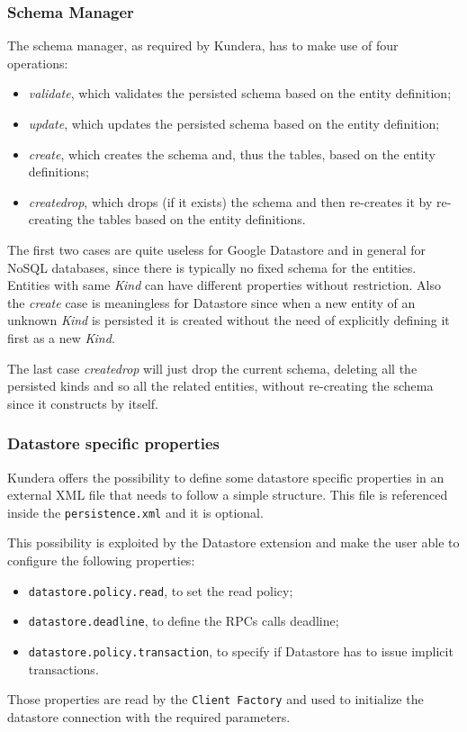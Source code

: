 \subsubsection{Schema Manager}
The schema manager, as required by Kundera, has to make use of four operations:
\begin{itemize}
\item \textit{validate}, which validates the persisted schema based on the entity definition;
\item \textit{update}, which updates the persisted schema based on the entity definition;
\item \textit{create}, which creates the schema and, thus the tables, based on the entity definitions;
\item \textit{create\textunderscore drop}, which drops (if it exists) the schema and then re-creates it by re-creating the tables based on the entity definitions.
\end{itemize}

\noindent The first two cases are quite useless for Google Datastore and in general for NoSQL databases, since there is typically no fixed schema for the entities. Entities with same \textit{Kind} can have different properties without restriction.
Also the \textit{create} case is meaningless for Datastore since when a new entity of an unknown \textit{Kind} is persisted it is created without the need of explicitly defining it first as a new \textit{Kind}.

\noindent The last case \textit{create\textunderscore drop} will just drop the current schema, deleting all the persisted kinds and so all the related entities, without re-creating the schema since it constructs by itself.

\subsubsection{Datastore specific properties}
Kundera offers the possibility to define some datastore specific properties in an external XML file that needs to follow a simple structure. This file is referenced inside the \texttt{persistence.xml} and it is optional.

\newparagraph This possibility is exploited by the Datastore extension and make the user able to configure the following properties:
\begin{itemize}
\item \texttt{datastore.policy.read}, to set the read policy;
\item \texttt{datastore.deadline}, to define the RPCs calls deadline;
\item \texttt{datastore.policy.transaction}, to specify if Datastore has to issue implicit transactions.
\end{itemize}
Those properties are read by the \texttt{Client Factory} and used to initialize the datastore connection with the required parameters.


